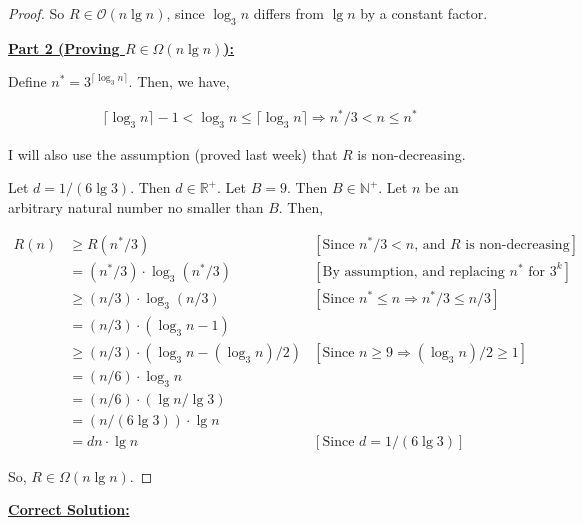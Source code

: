 \documentclass[12pt]{article}
\begin{document}
\begin{itemize}
\begin{proof}
    \bigskip

    So $R \in \mathcal{O}(n \lg n)$, since $\log_3 n$ differs from $\lg n$ by a constant factor.

    \bigskip

    \underline{\textbf{Part 2 (Proving $R \in \Omega(n \lg n)$):}}

    \bigskip

    Define $n^* = 3^{\lceil \log_3 n \rceil}$. Then, we have,

    \begin{align}
        \lceil \log_3 n \rceil - 1 < \log_3 n \leq \lceil \log_3 n \rceil \Rightarrow n^*/3 < n \leq n^*
    \end{align}

    I will also use the assumption (proved last week) that $R$ is non-decreasing.

    \bigskip

    Let $d = 1/(6\lg 3)$. Then $d \in \mathbb{R}^+$. Let $B = 9$. Then $B \in \mathbb{N}^+$. Let
    $n$ be an arbitrary natural number no smaller than $B$. Then,

    \begin{align}
    R(n) &\geq R(n^*/3) & [\text{Since $n^*/3 < n$, and $R$ is non-decreasing}]\\
    &= (n^*/3) \cdot \log_3 (n^*/3) & [\text{By assumption, and replacing $n^*$ for $3^k$}]\\
    &\geq (n/3) \cdot \log_3 (n/3) & [\text{Since $n^* \leq n \Rightarrow n^*/3 \leq n/3$}]\\
    &= (n/3) \cdot (\log_3 n - 1)\\
    &\geq (n/3) \cdot (\log_3 n - (\log_3 n)/2) & [\text{Since $n \geq 9 \Rightarrow (\log_3 n)/2 \geq 1$}]\\
    &= (n/6) \cdot \log_3 n\\
    &= (n/6) \cdot (\lg n/\lg 3)\\
    &= (n/(6\lg 3)) \cdot \lg n\\
    &= dn \cdot \lg n & [\text{Since $d = 1/(6\lg 3)$}]
    \end{align}

    So, $R \in \Omega(n \lg n)$.

    \end{proof}

    \bigskip

    \begin{mdframed}
    \underline{\textbf{Correct Solution:}}

    \bigskip


\end{mdframed}
\end{itemize}
\end{document}
